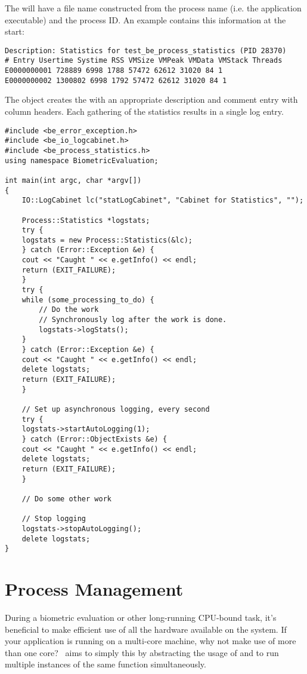The  will have a file name constructed from the process name (i.e.
the application executable) and the process ID. An example  contains
this information at the start:

\begin{verbatim}
Description: Statistics for test_be_process_statistics (PID 28370)
# Entry Usertime Systime RSS VMSize VMPeak VMData VMStack Threads
E0000000001 728889 6998 1788 57472 62612 31020 84 1
E0000000002 1300802 6998 1792 57472 62612 31020 84 1
\end{verbatim}

The  object creates the  with an appropriate description
and comment entry with column headers. Each gathering of the statistics results
in a single log entry.

\begin{lstlisting}[caption={Logging Process Statistics}, label=processstatisticslogging]
#include <be_error_exception.h>
#include <be_io_logcabinet.h>
#include <be_process_statistics.h>
using namespace BiometricEvaluation;

int main(int argc, char *argv[])
{
    IO::LogCabinet lc("statLogCabinet", "Cabinet for Statistics", "");

    Process::Statistics *logstats;
    try {
	logstats = new Process::Statistics(&lc);
    } catch (Error::Exception &e) {
	cout << "Caught " << e.getInfo() << endl;
	return (EXIT_FAILURE);
    }
    try {
	while (some_processing_to_do) {
	    // Do the work
	    // Synchronously log after the work is done.
	    logstats->logStats();
	}
    } catch (Error::Exception &e) {
	cout << "Caught " << e.getInfo() << endl;
	delete logstats;
	return (EXIT_FAILURE);
    }

    // Set up asynchronous logging, every second
    try {
	logstats->startAutoLogging(1);
    } catch (Error::ObjectExists &e) {
	cout << "Caught " << e.getInfo() << endl;
	delete logstats;
	return (EXIT_FAILURE);
    }

    // Do some other work

    // Stop logging
    logstats->stopAutoLogging();
    delete logstats;
}
\end{lstlisting}

\section{Process Management}
\label{sec-process_management}

During a biometric evaluation or other long-running CPU-bound task, it's 
beneficial to make efficient use of all the hardware available on the system.
If your application is running on a multi-core machine, why not make use of
more than one core?  \sname\ aims to simply this by abstracting the usage of
 and  to run multiple instances of the same
function simultaneously.

